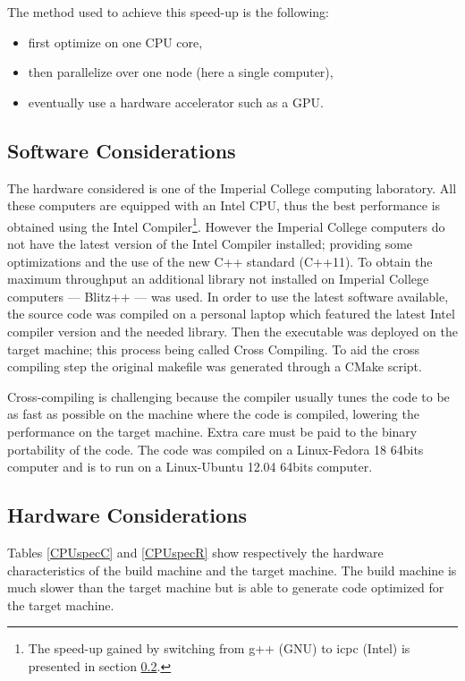 \documentclass[fleqn,11pt]{SelfArx} %
\theoremstyle{definition}
\begin{document}
The method used to achieve this speed-up is the following:
\begin{itemize}  \vspace{-4mm}
\item first optimize on one CPU core, \vspace{-4mm}
\item then parallelize over one node (here a single computer), \vspace{-4mm}
\item eventually use a hardware accelerator such as a GPU.
\end{itemize}

\subsection{Software Considerations}

The hardware considered is one of the Imperial College computing laboratory. All these computers are equipped with an Intel CPU, thus the best performance is obtained using the Intel Compiler\footnote{The speed-up gained by switching from g++ (GNU) to icpc (Intel) is presented in section \ref{}.}. However the Imperial College computers do not have the latest version of the Intel Compiler installed; providing some optimizations and the use of the new C++ standard (C++11). To obtain the maximum throughput an additional library not installed on Imperial College computers --- Blitz++ --- was used. In order to use the latest software available, the source code was compiled on a personal laptop which featured the latest Intel compiler version and the needed library. Then the executable was deployed on the target machine; this process being called Cross Compiling. To aid the cross compiling step the original makefile was generated through a CMake script.

Cross-compiling is challenging because the compiler usually tunes the code to be as fast as possible on the machine where the code is compiled, lowering the performance on the target machine. Extra care must be paid to the binary portability of the code. The code was compiled on a Linux-Fedora 18 64bits computer and is to run on a Linux-Ubuntu 12.04 64bits computer.


\FloatBarrier
\subsection{Hardware Considerations}

Tables \ref{CPUspecC} and \ref{CPUspecR} show respectively the hardware characteristics of the build machine and the target machine. The build machine is much slower than the target machine but is able to generate code optimized for the target machine.
\end{document}

